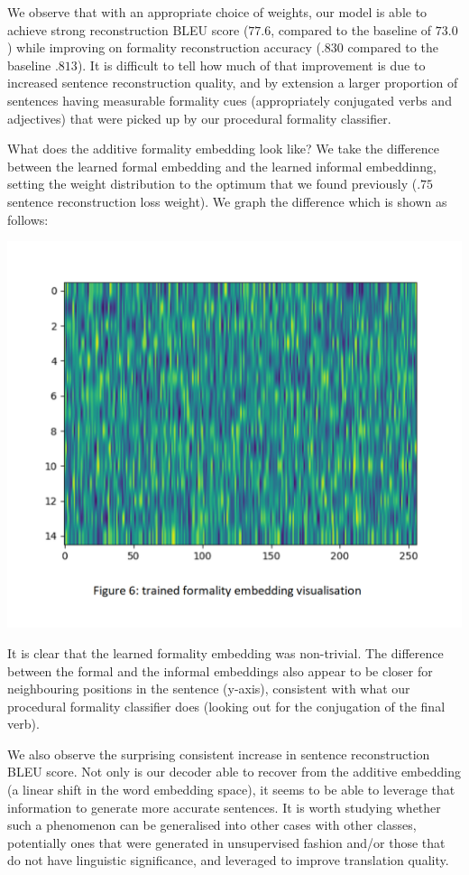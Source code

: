 \documentclass[11pt]{article}
\begin{document}
We observe that with an appropriate choice of weights, our model is able to achieve strong reconstruction BLEU score ($77.6$, compared to the baseline of $73.0$) while improving on formality reconstruction accuracy ($.830$ compared to the baseline $.813$). It is difficult to tell how much of that improvement is due to increased sentence reconstruction quality, and by extension a larger proportion of sentences having measurable formality cues (appropriately conjugated verbs and adjectives) that were picked up by our procedural formality classifier.

What does the additive formality embedding look like? We take the difference between the learned formal embedding and the learned informal embeddinng, setting the weight distribution to the optimum that we found previously ($.75$ sentence reconstruction loss weight). We graph the difference which is shown as follows:

\includegraphics{images/formality_embedding.png}

It is clear that the learned formality embedding was non-trivial. The difference between the formal and the informal embeddings also appear to be closer for neighbouring positions in the sentence (y-axis), consistent with what our procedural formality classifier does (looking out for the conjugation of the final verb).

We also observe the surprising consistent increase in sentence reconstruction BLEU score. Not only is our decoder able to recover from the additive embedding (a linear shift in the word embedding space), it seems to be able to leverage that information to generate more accurate sentences. It is worth studying whether such a phenomenon can be generalised into other cases with other classes, potentially ones that were generated in unsupervised fashion and/or those that do not have linguistic significance, and leveraged to improve translation quality.
\end{document}
